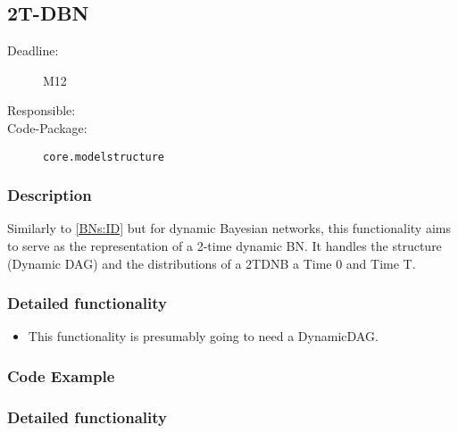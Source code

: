 \subsection{2T-DBN}
\label{2TDBN:ID}

\begin{description}
\item[Deadline:] M12
\item[Responsible:]
\item[Code-Package:] \texttt{core.modelstructure}
\end{description}

\subsubsection*{Description}

Similarly to \ref{BNs:ID} but for dynamic Bayesian networks, this functionality aims to serve as the representation of a 2-time dynamic BN. It handles the structure (Dynamic DAG) and the distributions of a 2TDNB a Time 0 and Time T. 


\subsubsection*{Detailed functionality}

\begin{itemize}
\item This functionality is presumably going to need a DynamicDAG.
\end{itemize}

\subsubsection*{Code Example}


\subsubsection*{Detailed functionality}
